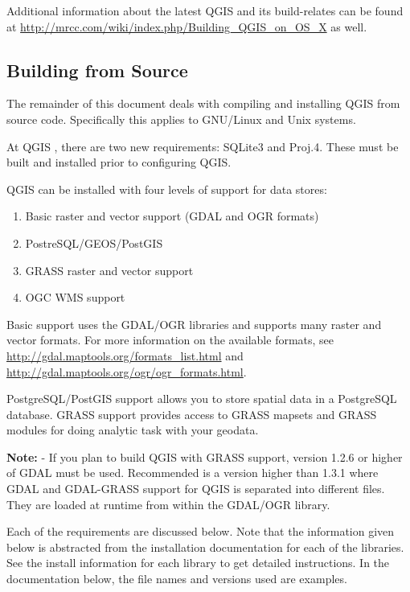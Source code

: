 Additional information about the latest QGIS and its build-relates can
be found at \url{http://mrcc.com/wiki/index.php/Building_QGIS_on_OS_X} as well.


\subsection{Building from Source}\label{label_sources}

The remainder of this document deals with compiling and installing QGIS
from source code. Specifically this applies to GNU/Linux and Unix systems.

At QGIS \CURRENT, there are two new requirements: SQLite3 and Proj.4. These must be
built and installed prior to configuring QGIS.

QGIS can be installed with four levels of support for data stores:
\begin{enumerate}
\item Basic raster and vector support (GDAL and OGR formats)
\item PostreSQL/GEOS/PostGIS 
\item GRASS raster and vector support
\item OGC WMS support
\end{enumerate} 

Basic support uses the GDAL/OGR libraries and supports many raster and
vector formats. For more information on the available formats, see
\url{http://gdal.maptools.org/formats_list.html} and
\url{http://gdal.maptools.org/ogr/ogr_formats.html}.

PostgreSQL/PostGIS support allows you to store spatial data in a PostgreSQL
database. GRASS support provides access to GRASS mapsets and GRASS modules
for doing analytic task with your geodata. 

\textbf{Note:} - If you plan to build QGIS with GRASS support, version
1.2.6 or higher of GDAL must be used. Recommended is a version higher than 
1.3.1 where GDAL and GDAL-GRASS support for QGIS is separated into different 
files. They are loaded at runtime from within the GDAL/OGR library.
  
Each of the requirements are discussed below. Note that the information
given below is abstracted from the installation documentation for each of
the libraries. See the install information for each library to get detailed
instructions. In the documentation below, the file names and versions used
are examples.

